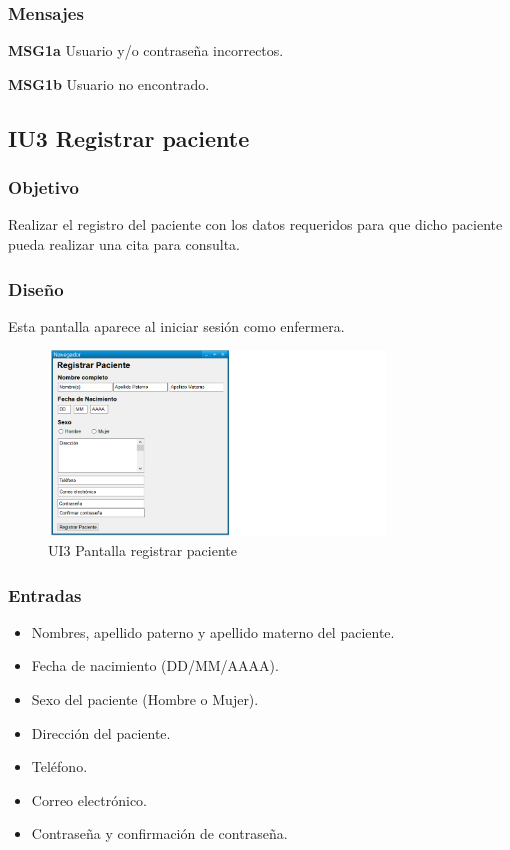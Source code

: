 \subsubsection{Mensajes}
	\begin{Citemize}
		\item {\bf MSG1a} Usuario y/o contraseña incorrectos.
        \item {\bf MSG1b} Usuario no encontrado.
	\end{Citemize}
    
    
\subsection{IU3 Registrar paciente}

\subsubsection{Objetivo}
	Realizar el registro del paciente con los datos requeridos para que dicho paciente pueda realizar una cita para consulta. 

\subsubsection{Diseño}
	Esta pantalla aparece al iniciar sesión como enfermera.

\begin{figure}[htbp!]
		\centering
			\includegraphics[width=0.8\textwidth]{images/UI3}
		\caption{UI3 Pantalla registrar paciente}
	\end{figure}


\subsubsection{Entradas}
\begin{itemize}
\item Nombres, apellido paterno y apellido materno del paciente.
\item Fecha de nacimiento (DD/MM/AAAA).
\item Sexo del paciente (Hombre o Mujer).
\item Dirección del paciente.
\item Teléfono.
\item Correo electrónico.
\item Contraseña y confirmación de contraseña.

\end{itemize}

